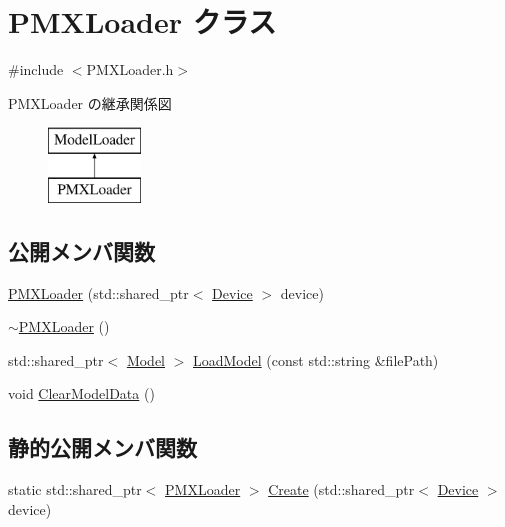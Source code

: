 \hypertarget{class_p_m_x_loader}{}\section{P\+M\+X\+Loader クラス}
\label{class_p_m_x_loader}


{\ttfamily \#include $<$P\+M\+X\+Loader.\+h$>$}

P\+M\+X\+Loader の継承関係図\begin{figure}[H]
\begin{center}
\leavevmode
\includegraphics[height=2.000000cm]{class_p_m_x_loader}
\end{center}
\end{figure}
\subsection*{公開メンバ関数}
\begin{DoxyCompactItemize}
\item 
\mbox{\hyperlink{class_p_m_x_loader_aa8e1053ae62f8c36518ed0605a19ebd8}{P\+M\+X\+Loader}} (std\+::shared\+\_\+ptr$<$ \mbox{\hyperlink{class_device}{Device}} $>$ device)
\item 
\mbox{\hyperlink{class_p_m_x_loader_a35af7321f1d7cddb974da619eeea46cd}{$\sim$\+P\+M\+X\+Loader}} ()
\item 
std\+::shared\+\_\+ptr$<$ \mbox{\hyperlink{class_model}{Model}} $>$ \mbox{\hyperlink{class_p_m_x_loader_aee4e81ab65eeec5c9772ed5a8de6c5fa}{Load\+Model}} (const std\+::string \&file\+Path)
\item 
void \mbox{\hyperlink{class_p_m_x_loader_a1c4f3f379e18d6978b7684ab9d901952}{Clear\+Model\+Data}} ()
\end{DoxyCompactItemize}
\subsection*{静的公開メンバ関数}
\begin{DoxyCompactItemize}
\item 
static std\+::shared\+\_\+ptr$<$ \mbox{\hyperlink{class_p_m_x_loader}{P\+M\+X\+Loader}} $>$ \mbox{\hyperlink{class_p_m_x_loader_afc9fa9ff6b5010857102ed82fd441f1b}{Create}} (std\+::shared\+\_\+ptr$<$ \mbox{\hyperlink{class_device}{Device}} $>$ device)
\end{DoxyCompactItemize}
